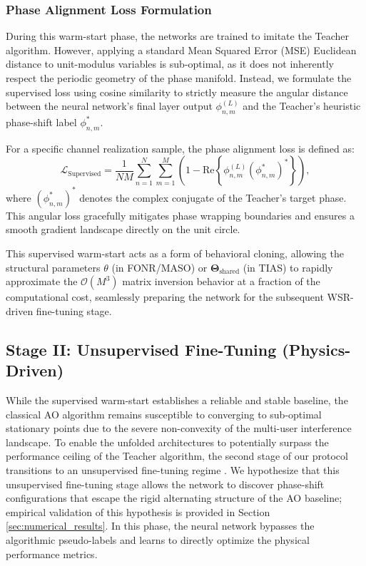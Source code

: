 \documentclass[journal]{IEEEtran}
\begin{document}
\subsubsection{Phase Alignment Loss Formulation}
During this warm-start phase, the networks are trained to imitate the Teacher algorithm. However, applying a standard Mean Squared Error (MSE) Euclidean distance to unit-modulus variables is sub-optimal, as it does not inherently respect the periodic geometry of the phase manifold. Instead, we formulate the supervised loss using cosine similarity to strictly measure the angular distance between the neural network's final layer output $\phi_{n,m}^{(L)}$ and the Teacher's heuristic phase-shift label $\phi_{n,m}^*$. 

For a specific channel realization sample, the phase alignment loss is defined as:
\begin{equation}
    \mathcal{L}_{\text{Supervised}} = \frac{1}{N M} \sum_{n=1}^N \sum_{m=1}^M \left( 1 - \text{Re} \left\{ \phi_{n,m}^{(L)} (\phi_{n,m}^*)^* \right\} \right),
\end{equation}
where $(\phi_{n,m}^*)^*$ denotes the complex conjugate of the Teacher's target phase. This angular loss gracefully mitigates phase wrapping boundaries and ensures a smooth gradient landscape directly on the unit circle. 

This supervised warm-start acts as a form of behavioral cloning, allowing the structural parameters $\theta$ (in FONR/MASO) or $\mathbf{\Theta}_{\text{shared}}$ (in TIAS) to rapidly approximate the $\mathcal{O}(M^3)$ matrix inversion behavior at a fraction of the computational cost, seamlessly preparing the network for the subsequent WSR-driven fine-tuning stage.

\subsection{Stage II: Unsupervised Fine-Tuning (Physics-Driven)}
\label{subsec:stage_2_unsupervised}

While the supervised warm-start establishes a reliable and stable baseline, the classical AO algorithm remains susceptible to converging to sub-optimal stationary points due to the severe non-convexity of the multi-user interference landscape. To enable the unfolded architectures to potentially surpass the performance ceiling of the Teacher algorithm, the second stage of our protocol transitions to an unsupervised fine-tuning regime . We hypothesize that this unsupervised fine-tuning stage allows the network to discover phase-shift configurations that escape the rigid alternating structure of the AO baseline; empirical validation of this hypothesis is provided in Section \ref{sec:numerical_results}. In this phase, the neural network bypasses the algorithmic pseudo-labels and learns to directly optimize the physical performance metrics.
\end{document}
